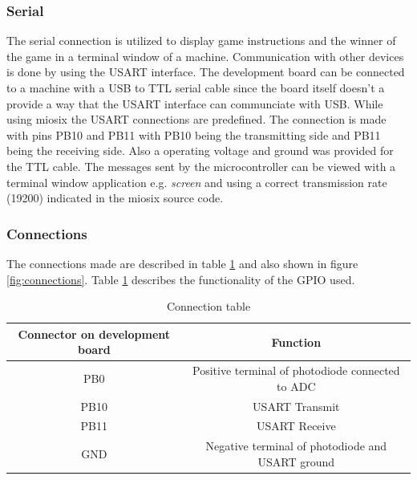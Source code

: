 \subsubsection{Serial}
The serial connection is utilized to display game instructions and the winner of the game in a terminal window of a machine. Communication with other devices is done by using the USART interface. The development board can be connected to a machine with a USB to TTL serial cable since the board itself doesn't a provide a way that the USART interface can communciate with USB. While using miosix the USART connections are predefined. The connection is made with pins PB10 and PB11 with PB10 being the transmitting side and PB11 being the receiving side. Also a operating voltage and ground was provided for the TTL cable. The messages sent by the microcontroller can be viewed with a terminal window application e.g. \emph{screen} and using a correct transmission rate (19200) indicated in the miosix source code.

\subsubsection{Connections}
The connections made are described in table \ref{table:1} and also shown in figure \ref{fig:connections}. Table \ref{table:1} describes the functionality of the GPIO used.

\begin{table}
\caption{Connection table}
\label{table:1}
\begin{center}
\begin{tabular}{ |c|c| } 
 \hline
 Connector on development board & Function\\ 
 \hline
 PB0 & Positive terminal of photodiode connected to ADC \\
 PB10 & USART Transmit \\
 PB11 & USART Receive \\
 GND & Negative terminal of photodiode and USART ground \\
 \hline
\end{tabular}
\end{center}
\end{table}

